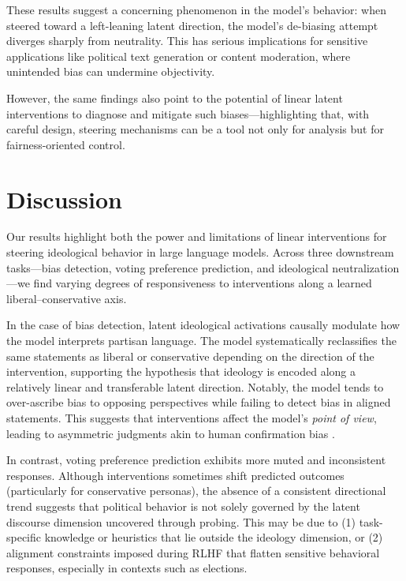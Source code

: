 \documentclass[11pt]{article}
\begin{document}
These results suggest a concerning phenomenon in the model’s behavior: when steered toward a left-leaning latent direction, the model's de-biasing attempt diverges sharply from neutrality. This has serious implications for sensitive applications like political text generation or content moderation, where unintended bias can undermine objectivity.

However, the same findings also point to the potential of linear latent interventions to diagnose and mitigate such biases—highlighting that, with careful design, steering mechanisms can be a tool not only for analysis but for fairness-oriented control.

\section{Discussion}

Our results highlight both the power and limitations of linear interventions for steering ideological behavior in large language models. Across three downstream tasks—bias detection, voting preference prediction, and ideological neutralization—we find varying degrees of responsiveness to interventions along a learned liberal--conservative axis.

In the case of bias detection, latent ideological activations causally modulate how the model interprets partisan language. The model systematically reclassifies the same statements as liberal or conservative depending on the direction of the intervention, supporting the hypothesis that ideology is encoded along a relatively linear and transferable latent direction. Notably, the model tends to over-ascribe bias to opposing perspectives while failing to detect bias in aligned statements. This suggests that interventions affect the model's \emph{point of view}, leading to asymmetric judgments akin to human confirmation bias \citep{nickersonConfirmationBiasUbiquitous1998}.

In contrast, voting preference prediction exhibits more muted and inconsistent responses. Although interventions sometimes shift predicted outcomes (particularly for conservative personas), the absence of a consistent directional trend suggests that political behavior is not solely governed by the latent discourse dimension uncovered through probing. This may be due to (1) task-specific knowledge or heuristics that lie outside the ideology dimension, or (2) alignment constraints imposed during RLHF that flatten sensitive behavioral responses, especially in contexts such as elections.
\end{document}
